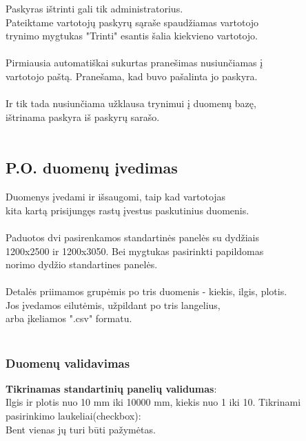 \documentclass[a4paper,12pt]{article}
\begin{document}
Paskyras ištrinti gali tik administratorius.\\

Pateiktame vartotojų paskyrų sąraše spaudžiamas vartotojo \\
trynimo mygtukas "Trinti" esantis šalia kiekvieno vartotojo.\\\\

Pirmiausia automatiškai sukurtas pranešimas nusiunčiamas į \\
vartotojo paštą. Pranešama, kad buvo pašalinta jo paskyra. \\\\

Ir tik tada nusiunčiama užklausa trynimui į duomenų bazę, \\
ištrinama paskyra iš paskyrų sarašo. \\\\
	
	
\subsection{ P.O. duomenų įvedimas }

Duomenys įvedami ir išsaugomi, taip kad vartotojas \\
kita kartą prisijungęs rastų įvestus paskutinius duomenis.\\\\
Paduotos dvi pasirenkamos standartinės panelės su dydžiais \\
1200x2500 ir 1200x3050. Bei mygtukas pasirinkti papildomas\\
norimo dydžio standartines panelės. \\\\
Detalės priimamos grupėmis po tris duomenis - kiekis, ilgis, plotis. \\
Jos įvedamos eilutėmis, užpildant po tris langelius, \\
arba įkeliamos ".csv" formatu.\\\\

\subsubsection{Duomenų validavimas}
\textbf{Tikrinamas standartinių panelių validumas}:\\
	Ilgis ir plotis nuo 10 mm iki 10000 mm, kiekis nuo 1 iki 10.
Tikrinami pasirinkimo laukeliai(checkbox): \\
Bent vienas jų turi būti pažymėtas.
\end{document}

